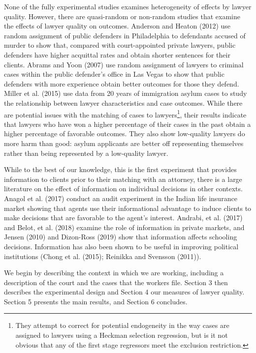 \documentclass[12 pt]{article}
\begin{document}
None of the fully experimental studies examines heterogeneity of effects by lawyer quality. However, there are quasi-random or non-random studies that examine the effects of lawyer quality on outcomes. Anderson and Heaton (2012) use random assignment of public defenders in Philadelphia to defendants accused of murder to show that, compared with court-appointed private lawyers, public defenders have higher acquittal rates and obtain shorter sentences for their clients. Abrams and Yoon (2007) use random assignment of lawyers to criminal cases within the public defender’s office in Las Vegas to show that public defenders with more experience obtain better outcomes for those they defend. Miller et al. (2015) use data from 20 years of immigration asylum cases to study the relationship between lawyer characteristics and case outcomes. While there are potential issues with the matching of cases to lawyers\footnote{They attempt to correct for potential endogeneity in the way cases are assigned to lawyers using a Heckman selection regression, but is it not obvious that any of the first stage regressors meet the exclusion restriction.},  their results indicate that lawyers who have won a higher percentage of their cases in the past obtain a higher percentage of favorable outcomes. They also show low-quality lawyers do more harm than good: asylum applicants are better off representing themselves rather than being represented by a low-quality lawyer.

While to the best of our knowledge, this is the first experiment that provides information to clients prior to their matching with an attorney, there is a large literature on the effect of information on individual decisions in other contexts. Anagol et al. (2017) conduct an audit experiment in the Indian life insurance market showing that agents use their informational advantage to induce clients to make decisions that are favorable to the agent’s interest. Andrabi, et al. (2017) and Belot, et al. (2018) examine the role of information in private markets, and Jensen (2010) and Dizon-Ross (2019) show that information affects schooling decisions. Information has also been shown to be useful in improving political institutions (Chong et al. (2015); Reinikka and Svensson (2011)). 

We begin by describing the context in which we are working, including a description of the court and the cases that the workers file. Section 3 then describes the experimental design and Section 4 our measures of lawyer quality. Section 5 presents the main results, and Section 6 concludes. 
\end{document}
